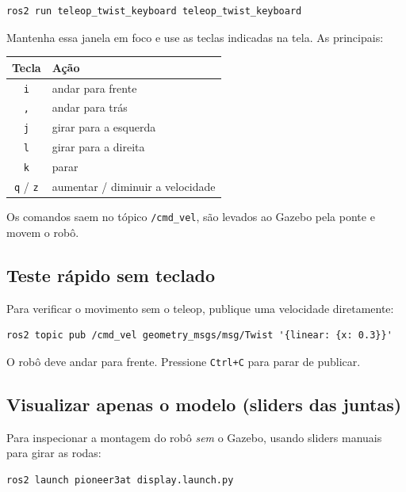 \documentclass[11pt,a4paper]{article}
\begin{document}
\begin{lstlisting}
ros2 run teleop_twist_keyboard teleop_twist_keyboard
\end{lstlisting}

\noindent
Mantenha essa janela em foco e use as teclas indicadas na tela. As principais:

\begin{center}
\begin{tabular}{cl}
\toprule
\textbf{Tecla} & \textbf{Ação} \\
\midrule
\texttt{i} & andar para frente \\
\texttt{,} & andar para tr\'as \\
\texttt{j} & girar para a esquerda \\
\texttt{l} & girar para a direita \\
\texttt{k} & parar \\
\texttt{q} / \texttt{z} & aumentar / diminuir a velocidade \\
\bottomrule
\end{tabular}
\end{center}

\noindent
Os comandos saem no t\'opico \texttt{/cmd\_vel}, s\~ao levados ao Gazebo pela
ponte e movem o rob\^o.

\subsection{Teste rápido sem teclado}

Para verificar o movimento sem o teleop, publique uma velocidade diretamente:

\begin{lstlisting}
ros2 topic pub /cmd_vel geometry_msgs/msg/Twist '{linear: {x: 0.3}}'
\end{lstlisting}

\noindent
O robô deve andar para frente. Pressione \texttt{Ctrl+C} para parar de publicar.

\subsection{Visualizar apenas o modelo (sliders das juntas)}

Para inspecionar a montagem do robô \emph{sem} o Gazebo, usando sliders manuais
para girar as rodas:

\begin{lstlisting}
ros2 launch pioneer3at display.launch.py
\end{lstlisting}
\end{document}

